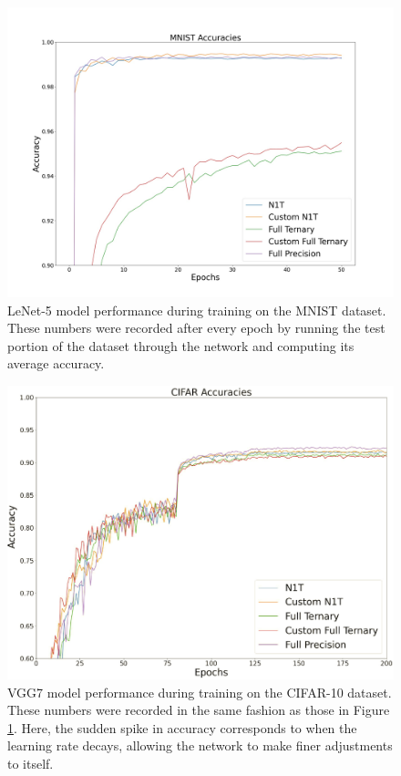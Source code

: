 \documentclass[11pt,a4paper,oldfontcommands]{memoir}
\begin{document}
\begin{figure}
    \centering
    \includegraphics[width=37em]{Results_Images/MNIST_Accuracy_Graph.jpg}
    \caption{LeNet-5 model performance during training on the MNIST dataset. These numbers were recorded after every epoch by running the test portion of the dataset through the network and computing its average accuracy.}
    \label{fig:mnist_accuracy}
\end{figure}

\begin{figure}
    \centering
    \includegraphics[width=37em]{Results_Images/CIFAR_Accuracy_Graph.jpg}
    \caption{VGG7 model performance during training on the CIFAR-10 dataset. These numbers were recorded in the same fashion as those in Figure \ref{fig:mnist_accuracy}.  Here, the sudden spike in accuracy corresponds to when the learning rate decays, allowing the network to make finer adjustments to itself.}
    \label{fig:cifar_accuracy}
\end{figure}
\end{document}
